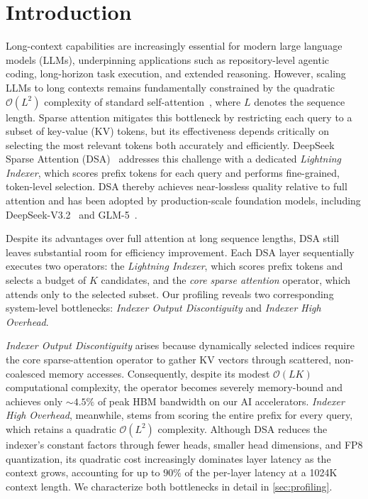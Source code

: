 \documentclass{article}
\newcommand{\kmax}{K}
\begin{document}
\section{Introduction}
\label{sec:intro}
Long-context capabilities are increasingly essential for modern large language models (LLMs), underpinning applications such as repository-level agentic coding, long-horizon task execution, and extended reasoning. However, scaling LLMs to long contexts remains fundamentally constrained by the quadratic $\mathcal{O}(L^2)$ complexity of standard self-attention~\citep{vaswani2017attention}, where $L$ denotes the sequence length. Sparse attention mitigates this bottleneck by restricting each query to a subset of key-value (KV) tokens, but its effectiveness depends critically on selecting the most relevant tokens both accurately and efficiently. DeepSeek Sparse Attention (DSA)~\citep{deepseek2025dsa} addresses this challenge with a dedicated \emph{Lightning Indexer}, which scores prefix tokens for each query and performs fine-grained, token-level selection. DSA thereby achieves near-lossless quality relative to full attention and has been adopted by production-scale foundation models, including DeepSeek-V3.2~\citep{deepseek2025v32} and GLM-5~\citep{zeng2026glm5}.

Despite its advantages over full attention at long sequence lengths, DSA still leaves substantial room for efficiency improvement. Each DSA layer sequentially executes two operators: the \emph{Lightning Indexer}, which scores prefix tokens and selects a budget of $\kmax$ candidates, and the \emph{core sparse attention} operator, which attends only to the selected subset. Our profiling reveals two corresponding system-level bottlenecks: \emph{Indexer Output Discontiguity} and \emph{Indexer High Overhead}.

\emph{Indexer Output Discontiguity} arises because dynamically selected indices require the core sparse-attention operator to gather KV vectors through scattered, non-coalesced memory accesses. Consequently, despite its modest $\mathcal{O}(L\kmax)$ computational complexity, the operator becomes severely memory-bound and achieves only ${\sim}4.5\%$ of peak HBM bandwidth on our AI accelerators. \emph{Indexer High Overhead}, meanwhile, stems from scoring the entire prefix for every query, which retains a quadratic $\mathcal{O}(L^2)$ complexity. Although DSA reduces the indexer's constant factors through fewer heads, smaller head dimensions, and FP8 quantization, its quadratic cost increasingly dominates layer latency as the context grows, accounting for up to $90\%$ of the per-layer latency at a 1024K context length. We characterize both bottlenecks in detail in \cref{sec:profiling}.
\end{document}
